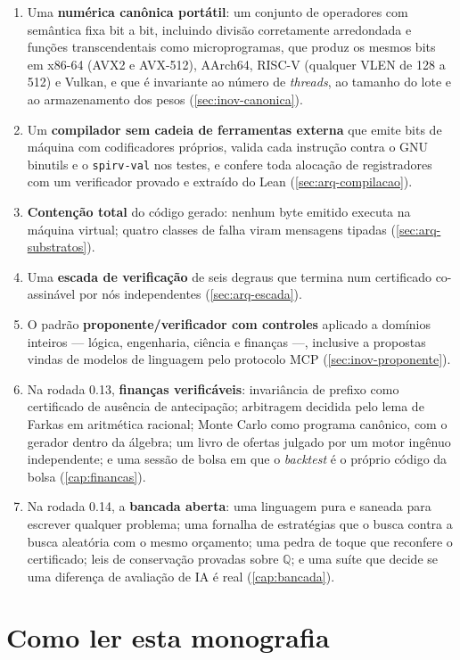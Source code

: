 \begin{enumerate}
  \item Uma \textbf{numérica canônica portátil}: um conjunto de operadores com semântica fixa bit a bit, incluindo divisão corretamente arredondada e funções transcendentais como microprogramas, que produz os mesmos bits em x86-64 (AVX2 e AVX-512), AArch64, RISC-V (qualquer VLEN de 128 a 512) e Vulkan, e que é invariante ao número de \textit{threads}, ao tamanho do lote e ao armazenamento dos pesos (\autoref{sec:inov-canonica}).
  \item Um \textbf{compilador sem cadeia de ferramentas externa} que emite bits de máquina com codificadores próprios, valida cada instrução contra o GNU binutils e o \texttt{spirv-val} nos testes, e confere toda alocação de registradores com um verificador provado e extraído do Lean (\autoref{sec:arq-compilacao}).
  \item \textbf{Contenção total} do código gerado: nenhum byte emitido executa na máquina virtual; quatro classes de falha viram mensagens tipadas (\autoref{sec:arq-substratos}).
  \item Uma \textbf{escada de verificação} de seis degraus que termina num certificado co-assinável por nós independentes (\autoref{sec:arq-escada}).
  \item O padrão \textbf{proponente/verificador com controles} aplicado a domínios inteiros --- lógica, engenharia, ciência e finanças ---, inclusive a propostas vindas de modelos de linguagem pelo protocolo MCP (\autoref{sec:inov-proponente}).
  \item Na rodada 0.13, \textbf{finanças verificáveis}: invariância de prefixo como certificado de ausência de antecipação; arbitragem decidida pelo lema de Farkas em aritmética racional; Monte Carlo como programa canônico, com o gerador dentro da álgebra; um livro de ofertas julgado por um motor ingênuo independente; e uma sessão de bolsa em que o \textit{backtest} é o próprio código da bolsa (\autoref{cap:financas}).
  \item Na rodada 0.14, a \textbf{bancada aberta}: uma linguagem pura e saneada para escrever qualquer problema; uma fornalha de estratégias que o busca contra a busca aleatória com o mesmo orçamento; uma pedra de toque que reconfere o certificado; leis de conservação provadas sobre $\mathbb{Q}$; e uma suíte que decide se uma diferença de avaliação de IA é real (\autoref{cap:bancada}).
\end{enumerate}

\section{Como ler esta monografia}\label{sec:leitura}

